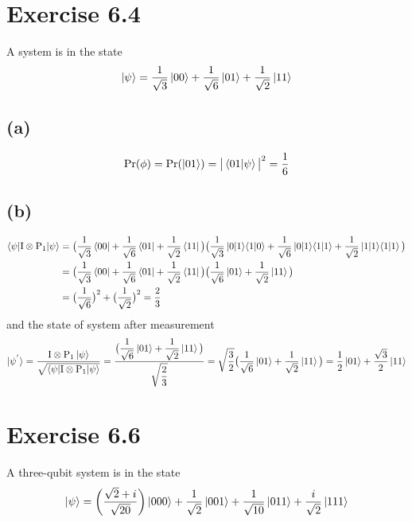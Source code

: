 \documentclass{article}
\newcommand{\op}[2]{|#1\rangle \langle#2|}
\newcommand{\sand}[3]{\braket{#1 | #2 | #3}}
\begin{document}
\section*{Exercise 6.4}
A system is in the state
\begin{align*}
    \ket{\psi} = \frac{1}{\sqrt{3}}\ket{00} + \frac{1}{\sqrt{6}}\ket{01} + \frac{1}{\sqrt{2}}\ket{11}
\end{align*}
\subsection*{(a)}
\begin{align*}
    \text{Pr}(\phi) = \text{Pr}(\ket{01}) = \big|\braket{01|\psi}\big|^2 = \frac{1}{6}
\end{align*}
\subsection*{(b)}
\begin{align*}
   \sand{\psi}{\text{I} \otimes \text{P}_{1}}{\psi} &= \big(\frac{1}{\sqrt{3}}\bra{00} + \frac{1}{\sqrt{6}}\bra{01} + \frac{1}{\sqrt{2}}\bra{11}\big)\big(\frac{1}{\sqrt{3}}\ket{0\op{1}{1}0} + \frac{1}{\sqrt{6}}\ket{0\op{1}{1}1} + \frac{1}{\sqrt{2}}\ket{1\op{1}{1}1}\big) \\
   &= \big(\frac{1}{\sqrt{3}}\bra{00} + \frac{1}{\sqrt{6}}\bra{01} + \frac{1}{\sqrt{2}}\bra{11}\big)\big( \frac{1}{\sqrt{6}}\ket{01} + \frac{1}{\sqrt{2}}\ket{11}\big)\\
   &= \big(\frac{1}{\sqrt{6}}\big)^2 + \big(\frac{1}{\sqrt{2}}\big)^2 = \frac{2}{3}
\end{align*}
and the state of system after measurement
\begin{align*}
    \ket{\psi^{'}} = \frac{\text{I} \otimes \text{P}_{1}\ket{\psi}}{\sqrt{ \sand{\psi}{\text{I} \otimes \text{P}_{1}}{\psi}}} = \frac{\big(\displaystyle \frac{1}{\sqrt{6}}\ket{01} + \frac{1}{\sqrt{2}}\ket{11}\big)}{\displaystyle\sqrt{\frac{2}{3}}}
    = \sqrt{\frac{3}{2}}\big(\frac{1}{\sqrt{6}}\ket{01} + \frac{1}{\sqrt{2}}\ket{11}\big)
    = \frac{1}{2}\ket{01} + \frac{\sqrt{3}}{2}\ket{11}
\end{align*}
\section*{Exercise 6.6}
A three-qubit system is in the state
\begin{align*}
    \ket{\psi} = \bigg(\frac{\sqrt{2} + i}{\sqrt{20}}\bigg)\ket{000} + \frac{1}{\sqrt{2}}\ket{001} + \frac{1}{\sqrt{10}}\ket{011} + \frac{i}{\sqrt{2}}\ket{111}
\end{align*}
\end{document}
